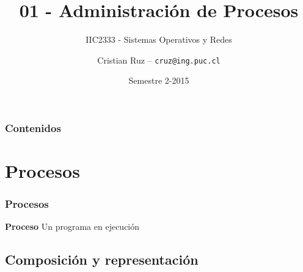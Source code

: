\documentclass[letter]{beamer}
\title[IIC2333] %
{01 - Administración de Procesos}
\subtitle{IIC2333 - Sistemas Operativos y Redes}
\author[C.Ruz] %
{Cristian Ruz -- {\tt cruz@ing.puc.cl} }
\institute[PUC] %
{
  Departamento de Ciencia de la Computación\\
  Pontificia Universidad Católica de Chile
}
\date[2/2015] %
{Semestre 2-2015}
\begin{document}
\frame{\titlepage}

\begin{frame}
\frametitle{Contenidos}
\tableofcontents
\end{frame}


\section{Procesos}

\begin{frame}
  \frametitle{Procesos}

  \begin{alertblock}{{\bf Proceso}}
    Un programa en ejecución
  \end{alertblock}

\end{frame}

\subsection{Composición y representación}
\end{document}
